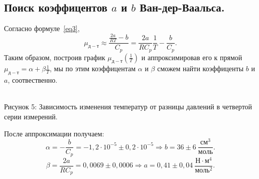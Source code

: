 \documentclass[a4paper,11pt]{article}
\begin{document}
\subsection{Поиск коэффицентов $a$ и $b$ Ван-дер-Ваальса.}
Согласно формуле~\ref{eq3},
$$\mu_{д-т} \approx \frac{\frac{2a}{RT} - b}{C_{p}} = \frac{2a}{R C_{p}} \frac{1}{T} - \frac{b}{C_{p}}.$$
Таким образом, построив график $\mu_{д-т}\left(\frac{1}{T}\right)$ и аппроксимировав его к прямой $\mu_{д-т} = \alpha + \beta \frac{1}{T}$, мы по этим коэффицентам $\alpha$ и $\beta$ сможем найти коэффиценты $b$ и $a$, соотвественно.
\begin{center}
\\
Рисунок 5: Зависимость изменения температур от разницы давлений в четвертой серии измерений.\\
\end{center}
После аппроксимации получаем:
$$\alpha = -\frac{b}{C_{p}} = -1,2 \cdot 10^{-5} \pm 0,2 \cdot 10^{-5} \Rightarrow b = 36 \pm 6\ \frac{см^{3}}{моль}.$$
$$\beta = \frac{2a}{RC_{p}} = 0,0069 \pm 0,0006 \Rightarrow a = 0,41 \pm 0,04\ \frac{Н \cdot м^{4}}{моль^{2}}.$$
\end{document}
